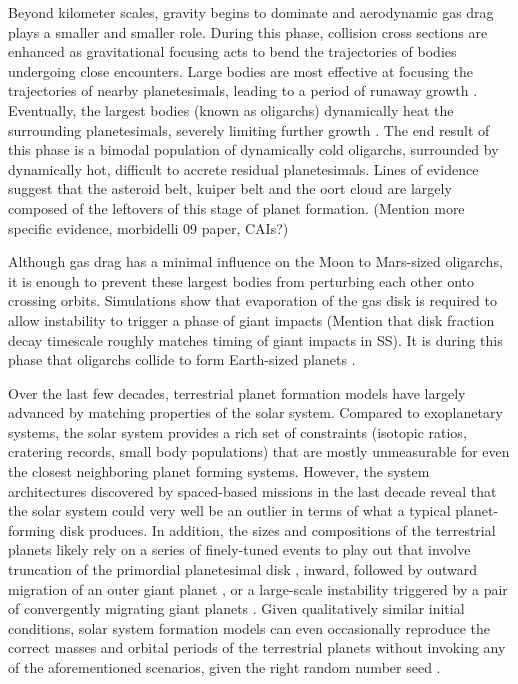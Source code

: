 \documentclass[twocolumn]{aastex63}
\begin{document}
Beyond kilometer scales, gravity begins to dominate and aerodynamic gas drag plays a smaller and smaller role. During this phase, collision cross sections are enhanced as gravitational focusing \citep{safronov69} acts to bend the trajectories of bodies undergoing close encounters. Large bodies are most effective at focusing the trajectories of nearby planetesimals, leading to a period of runaway growth \citep{wetherill89, kokubo96, barnes09}. Eventually, the largest bodies (known as oligarchs) dynamically heat the surrounding planetesimals, severely limiting further growth \citep{kokubo98}. The end result of this phase is a bimodal population of dynamically cold oligarchs, surrounded by dynamically hot, difficult to accrete residual planetesimals. Lines of evidence suggest that the asteroid belt, kuiper belt and the oort cloud are largely composed of the leftovers of this stage of planet formation. (Mention more specific evidence, morbidelli 09 paper, CAIs?)

Although gas drag has a minimal influence on the Moon to Mars-sized oligarchs, it is enough to prevent these largest bodies from perturbing each other onto crossing orbits. Simulations show that evaporation of the gas disk is required to allow instability to trigger a phase of giant impacts (Mention that disk fraction decay timescale roughly matches timing of giant impacts in SS). It is during this phase that oligarchs collide to form Earth-sized planets \citep{chambers98, raymond06}.

Over the last few decades, terrestrial planet formation models have largely advanced by matching properties of the solar system. Compared to exoplanetary systems, the solar system provides a rich set of constraints (isotopic ratios, cratering records, small body populations) that are mostly unmeasurable for even the closest neighboring planet forming systems. However, the system architectures discovered by spaced-based missions in the last decade reveal that the solar system could very well be an outlier in terms of what a typical planet-forming disk produces. In addition, the sizes and compositions of the terrestrial planets likely rely on a series of finely-tuned events to play out that involve truncation of the primordial planetesimal disk \citep{raymond17}, inward, followed by outward migration of an outer giant planet \citep{walsh11}, or a large-scale instability triggered by a pair of convergently migrating giant planets \citep{tsiganis05, levison11, nesvorny11}. Given qualitatively similar initial conditions, solar system formation models can even occasionally reproduce the correct masses and orbital periods of the terrestrial planets without invoking any of the aforementioned scenarios, given the right random number seed \citep{fischer14}.
\end{document}
